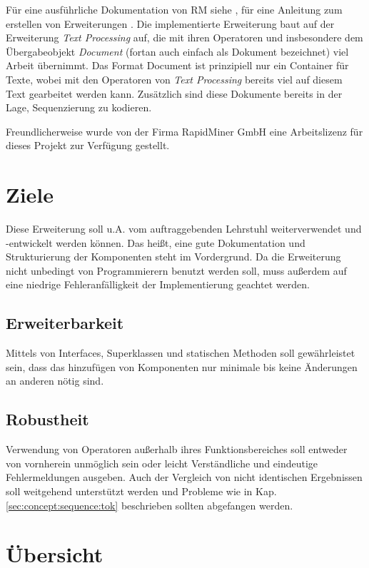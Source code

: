 Für eine ausführliche Dokumentation von RM siehe \cite{rmdoc}, für eine Anleitung zum erstellen von Erweiterungen \cite{rmext}.
 Die implementierte Erweiterung baut auf der Erweiterung \textit{Text Processing} auf, die mit ihren Operatoren und insbesondere dem Übergabeobjekt \textit{Document} (fortan auch einfach als Dokument bezeichnet) viel Arbeit übernimmt. Das Format Document ist prinzipiell nur ein Container für Texte, wobei mit den Operatoren von \textit{Text Processing} bereits viel auf diesem Text gearbeitet werden kann. Zusätzlich sind diese Dokumente bereits in der Lage, Sequenzierung zu kodieren.
 
 Freundlicherweise wurde von der Firma RapidMiner GmbH eine Arbeitslizenz für dieses Projekt zur Verfügung gestellt.

\section{Ziele}
\label{sec:impl:aims}
Diese Erweiterung soll u.A. vom auftraggebenden Lehrstuhl weiterverwendet und -entwickelt werden können. Das heißt, eine gute Dokumentation und Strukturierung der Komponenten steht im Vordergrund. Da die Erweiterung nicht unbedingt von Programmierern benutzt werden soll, muss außerdem auf eine niedrige Fehleranfälligkeit der Implementierung geachtet werden.
\subsection{Erweiterbarkeit}
Mittels von Interfaces, Superklassen und statischen Methoden soll gewährleistet sein, dass das hinzufügen von Komponenten nur minimale bis keine Änderungen an anderen nötig sind.
\subsection{Robustheit}
Verwendung von Operatoren außerhalb ihres Funktionsbereiches soll entweder von vornherein unmöglich sein oder leicht Verständliche und eindeutige Fehlermeldungen ausgeben. Auch der Vergleich von nicht identischen Ergebnissen soll weitgehend unterstützt werden und Probleme wie in Kap. \ref{sec:concept:sequence:tok} beschrieben sollten abgefangen werden.

\section{Übersicht}
\label{sec:impl:structure}

